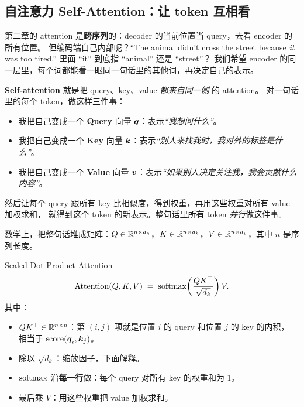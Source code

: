 \subsection{自注意力 Self-Attention：让 token 互相看}
\label{subsec:ch03-selfattn}

\begin{problemblock}
第二章的 attention 是\textbf{跨序列}的：decoder 的当前位置当 query，去看 encoder 的所有位置。
但编码端自己内部呢？“The animal didn't cross the street because \emph{it} was too tired.” 里面 ``it'' 到底指 ``animal'' 还是 ``street''？
我们希望 encoder 的同一层里，每个词都能看一眼同一句话里的其他词，再决定自己的表示。
\end{problemblock}

\begin{intuitionblock}
\textbf{Self-attention} 就是把 query、key、value \emph{都来自同一侧} 的 attention。
对一句话里的每个 token，做这样三件事：
\begin{itemize}
  \item 我把自己变成一个 \textbf{Query} 向量 $\boldsymbol{q}$：表示\emph{“我想问什么”}。
  \item 我把自己变成一个 \textbf{Key} 向量 $\boldsymbol{k}$：表示\emph{“别人来找我时，我对外的标签是什么”}。
  \item 我把自己变成一个 \textbf{Value} 向量 $\boldsymbol{v}$：表示\emph{“如果别人决定关注我，我会贡献什么内容”}。
\end{itemize}
然后让每个 query 跟所有 key 比相似度，得到权重，再用这些权重对所有 value 加权求和，
就得到这个 token 的新表示。整句话里所有 token \emph{并行}做这件事。
\end{intuitionblock}

数学上，把整句话堆成矩阵：$Q \in \mathbb{R}^{n \times d_k}$，$K \in \mathbb{R}^{n \times d_k}$，$V \in \mathbb{R}^{n \times d_v}$，其中 $n$ 是序列长度。

\begin{mathbox}{Scaled Dot-Product Attention}
\[
  \mathrm{Attention}(Q, K, V)
  \;=\; \mathrm{softmax}\!\left(\frac{Q K^\top}{\sqrt{d_k}}\right) V .
\]
其中：
\begin{itemize}
  \item $Q K^\top \in \mathbb{R}^{n \times n}$：第 $(i,j)$ 项就是位置 $i$ 的 query 和位置 $j$ 的 key 的内积，
        相当于 $\mathrm{score}(\boldsymbol{q}_i, \boldsymbol{k}_j)$。
  \item 除以 $\sqrt{d_k}$：缩放因子，下面解释。
  \item $\mathrm{softmax}$ 沿\textbf{每一行}做：每个 query 对所有 key 的权重和为 1。
  \item 最后乘 $V$：用这些权重把 value 加权求和。
\end{itemize}
\end{mathbox}

